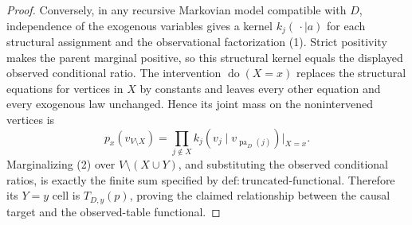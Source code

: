 \documentclass{article}
\begin{document}
\begin{proof}
Conversely, in any recursive Markovian model compatible with \(D\), independence of the exogenous variables gives a kernel \(k_j(\,\cdot\mid a)\) for each structural assignment and the observational factorization (1).  Strict positivity makes the parent marginal positive, so this structural kernel equals the displayed observed conditional ratio.  The intervention \(\operatorname{do}(X=x)\) replaces the structural equations for vertices in \(X\) by constants and leaves every other equation and every exogenous law unchanged.  Hence its joint mass on the nonintervened vertices is
\[
 p_x(v_{V\setminus X})
 =\prod_{j\notin X}k_j(v_j\mid v_{\operatorname{pa}_D(j)})\big|_{X=x}. \tag{2}
\]
Marginalizing (2) over \(V\setminus(X\cup Y)\), and substituting the observed conditional ratios, is exactly the finite sum specified by \(\mathrm{def{:}truncated\text{-}functional}\).  Therefore its \(Y=y\) cell is \(T_{D,y}(p)\), proving the claimed relationship between the causal target and the observed-table functional.
\end{proof}
\end{document}
